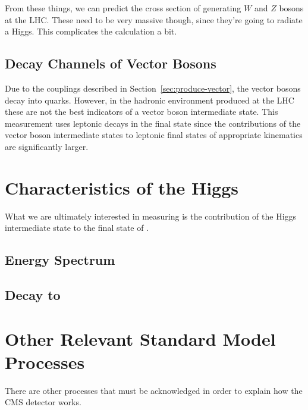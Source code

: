 From these things, we can predict the cross section of generating $W$ and $Z$ bosons at the LHC.
These need to be very massive though, since they're going to radiate a Higgs.
This complicates the calculation a bit.


\subsection{Decay Channels of Vector Bosons}

Due to the couplings described in Section~\ref{sec:produce-vector},
the vector bosons decay into quarks.
However, in the hadronic environment produced at the LHC
these are not the best indicators of a vector boson intermediate state.
This measurement uses leptonic decays in the final state
since the contributions of the vector boson intermediate states to leptonic final states
of appropriate kinematics are significantly larger.


\section{Characteristics of the Higgs}

What we are ultimately interested in measuring is the contribution of the
Higgs intermediate state to the final state of \bb.

\subsection{Energy Spectrum}

\subsection{Decay to \bb}

\section{Other Relevant Standard Model Processes}

There are other processes that must be acknowledged in order to explain how the CMS detector works.
